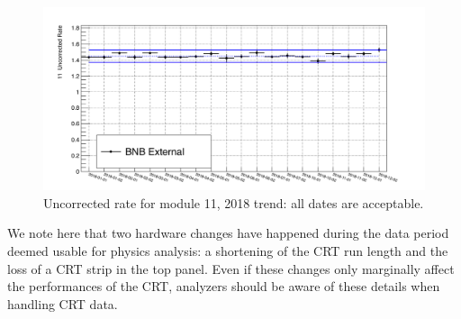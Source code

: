 \begin{figure}[h!]
\centering
\includegraphics[scale=0.4]{images/hHitsOverEvt_FEB_11.png}
\caption{Uncorrected rate for module 11, 2018 trend: all dates are acceptable.}
\label{Annual11_ex}
\end{figure}


We note here that two hardware changes have happened during the data period deemed usable for physics analysis: a shortening of the CRT run length and the loss of a CRT strip in the top panel. Even if these changes only marginally affect the performances of the CRT, analyzers should be aware of these details when handling CRT data.

\clearpage
